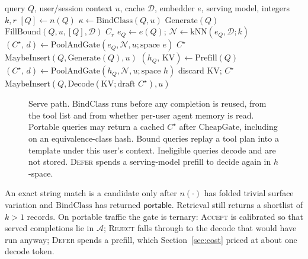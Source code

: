 \begin{algorithm}[t]
\caption{Serve a query against a completion cache.}
\label{alg:serve}
\begin{algorithmic}[1]
\Require query $Q$, user/session context $u$, cache $\mathcal{D}$, embedder $e$, serving model, integers $k,r$
\State $[Q] \gets n(Q)$ 
\State $\kappa \gets \mathrm{BindClass}(Q,u)$ 
  \State \Return $\mathrm{Generate}(Q)$ 
\EndIf
{}
  \State \Return $\mathrm{FillBound}(Q,u,[Q],\mathcal{D})$ 
\EndIf
{}
    \State \Return $C_r$ 
  \EndIf
\EndIf
\State $e_Q \gets e(Q)$; \quad $\mathcal{N} \gets \mathrm{kNN}(e_Q,\mathcal{D};k)$
\State $(C^\star,\, d) \gets \mathrm{PoolAndGate}(e_Q,\mathcal{N},u; \text{space }e)$
  \State \Return $C^\star$ 
\EndIf
{}
  \State \Return $\mathrm{MaybeInsert}(Q,\mathrm{Generate}(Q),u)$
\EndIf
\State $(h_Q,\,\mathrm{KV}) \gets \mathrm{Prefill}(Q)$ 
\State $(C^\star,\, d) \gets \mathrm{PoolAndGate}(h_Q,\mathcal{N},u; \text{space }h)$
  \State discard $\mathrm{KV}$; \quad \Return $C^\star$
\EndIf
\State \Return $\mathrm{MaybeInsert}(Q,\mathrm{Decode}(\mathrm{KV}; \text{draft }C^\star),u)$
\end{algorithmic}
\end{algorithm}

\begin{figure}[t]
\centering
\resizebox{\textwidth}{!}{}
\caption{Serve path. $\mathrm{BindClass}$ runs before any completion is reused, from the tool list and from whether per-user agent memory is read. Portable queries may return a cached $C^\star$ after $\mathrm{CheapGate}$, including on an equivalence-class hash. Bound queries replay a tool plan into a template under this user's context. Ineligible queries decode and are not stored. \textsc{Defer} spends a serving-model prefill to decide again in $h$-space.}
\label{fig:serve}
\end{figure}

An exact string match is a candidate only after $n(\cdot)$ has folded trivial surface variation and $\mathrm{BindClass}$ has returned $\mathsf{portable}$. Retrieval still returns a shortlist of $k>1$ records. On portable traffic the gate is ternary: \textsc{Accept} is calibrated so that served completions lie in $\mathcal{A}$; \textsc{Reject} falls through to the decode that would have run anyway; \textsc{Defer} spends a prefill, which Section~\ref{sec:cost} priced at about one decode token.

